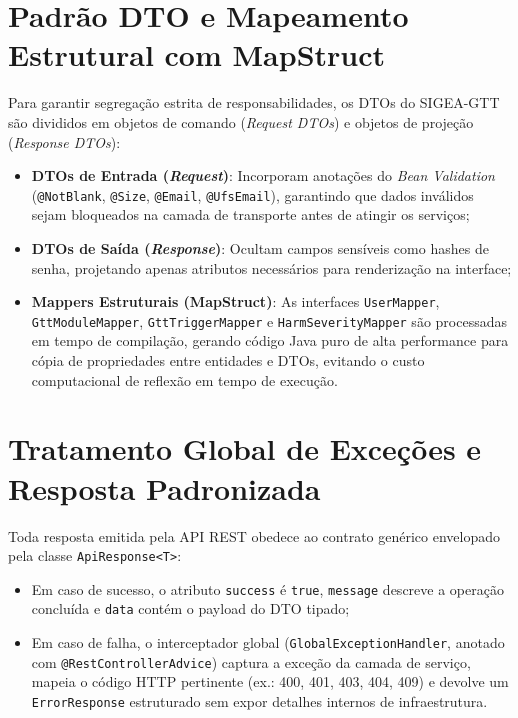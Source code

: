 \section{Padrão DTO e Mapeamento Estrutural com MapStruct}
\label{sec_padrao_dto_mapstruct}

Para garantir segregação estrita de responsabilidades, os DTOs do SIGEA-GTT são divididos em objetos de comando (\textit{Request DTOs}) e objetos de projeção (\textit{Response DTOs}):

\begin{itemize}
    \item \textbf{DTOs de Entrada (\textit{Request})}: Incorporam anotações do \textit{Bean Validation} (\texttt{@NotBlank}, \texttt{@Size}, \texttt{@Email}, \texttt{@UfsEmail}), garantindo que dados inválidos sejam bloqueados na camada de transporte antes de atingir os serviços;
    \item \textbf{DTOs de Saída (\textit{Response})}: Ocultam campos sensíveis como hashes de senha, projetando apenas atributos necessários para renderização na interface;
    \item \textbf{Mappers Estruturais (MapStruct)}: As interfaces \texttt{UserMapper}, \texttt{GttModuleMapper}, \texttt{GttTriggerMapper} e \texttt{HarmSeverityMapper} são processadas em tempo de compilação, gerando código Java puro de alta performance para cópia de propriedades entre entidades e DTOs, evitando o custo computacional de reflexão em tempo de execução.
\end{itemize}

\section{Tratamento Global de Exceções e Resposta Padronizada}
\label{sec_tratamento_excecoes}

Toda resposta emitida pela API REST obedece ao contrato genérico envelopado pela classe \texttt{ApiResponse<T>}:
\begin{itemize}
    \item Em caso de sucesso, o atributo \texttt{success} é \texttt{true}, \texttt{message} descreve a operação concluída e \texttt{data} contém o payload do DTO tipado;
    \item Em caso de falha, o interceptador global (\texttt{GlobalExceptionHandler}, anotado com \texttt{@RestControllerAdvice}) captura a exceção da camada de serviço, mapeia o código HTTP pertinente (ex.: 400, 401, 403, 404, 409) e devolve um \texttt{ErrorResponse} estruturado sem expor detalhes internos de infraestrutura.
\end{itemize}
